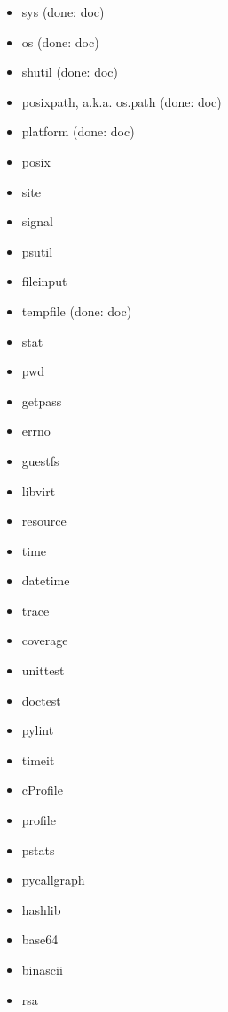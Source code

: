 \documentclass{article}
\begin{document}
\begin{enumerate}
\begin{itemize}
            \item sys (done: doc)
            \item os (done: doc)
            \item shutil (done: doc)
            \item posixpath, a.k.a. os.path (done: doc)
            \item platform (done: doc)
            \item posix
            \item site
            \item signal
            \item psutil
            \item fileinput
            \item tempfile (done: doc)
            \item stat
            \item pwd
            \item getpass
            \item errno
            \item guestfs
            \item libvirt
            \item resource

            \item time
            \item datetime

            \item trace
            \item coverage
            \item unittest
            \item doctest

            \item pylint

            \item timeit
            \item cProfile
            \item profile
            \item pstats
            \item pycallgraph

            \item hashlib
            \item base64
            \item binascii
            \item rsa


\end{itemize}
\end{enumerate}
\end{document}
